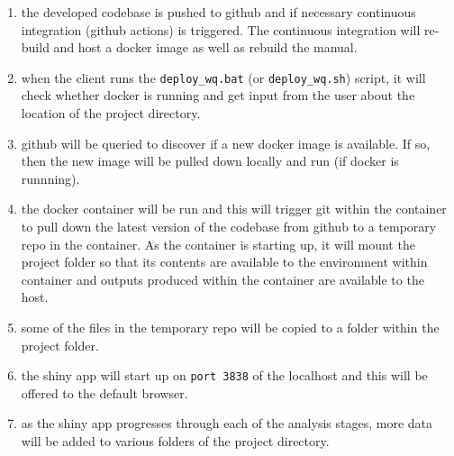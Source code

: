 \documentclass[
  8pt,
  a4paper]{article}
\providecommand{\tightlist}{%
  \setlength{\itemsep}{0pt}\setlength{\parskip}{0pt}}
\begin{document}
\begin{enumerate}
\def\labelenumi{\arabic{enumi}.}
\tightlist
\item
  the developed codebase is pushed to github and if necessary continuous
  integration (github actions) is triggered. The continuous integration
  will re-build and host a docker image as well as rebuild the manual.
\item
  when the client runs the \texttt{deploy\_wq.bat} (or
  \texttt{deploy\_wq.sh}) script, it will check whether docker is
  running and get input from the user about the location of the project
  directory.
\item
  github will be queried to discover if a new docker image is available.
  If so, then the new image will be pulled down locally and run (if
  docker is runnning).
\item
  the docker container will be run and this will trigger git within the
  container to pull down the latest version of the codebase from github
  to a temporary repo in the container. As the container is starting up,
  it will mount the project folder so that its contents are available to
  the environment within container and outputs produced within the
  container are available to the host.
\item
  some of the files in the temporary repo will be copied to a folder
  within the project folder.
\item
  the shiny app will start up on \texttt{port\ 3838} of the localhost
  and this will be offered to the default browser.
\item
  as the shiny app progresses through each of the analysis stages, more
  data will be added to various folders of the project directory.
\end{enumerate}
\end{document}
